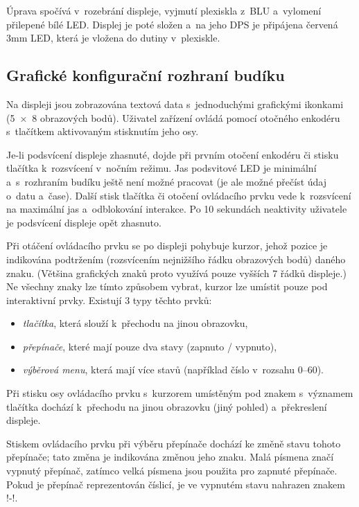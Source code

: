 Úprava spočívá v~rozebrání displeje, vyjmutí plexiskla z~BLU a~vylomení
přilepené bílé LED. Displej je poté složen a~na jeho DPS je připájena červená
\num{3}\si{\milli\meter} LED, která je vložena do dutiny v~plexiskle.


\FloatBarrier
\subsection{Grafické konfigurační rozhraní budíku}
Na displeji jsou zobrazována textová data s~jednoduchými grafickými ikonkami
(\num{5 x 8} obrazových bodů). Uživatel zařízení ovládá pomocí otočného
enkodéru s~tlačítkem aktivovaným stisknutím jeho osy.

Je-li podsvícení displeje zhasnuté, dojde při prvním otočení enkodéru či stisku
tlačítka k~rozsvícení v~nočním režimu. Jas podsvitové LED je minimální
a~s~rozhraním budíku ještě není možné pracovat (je ale možné přečíst údaj
o~datu a~čase). Další stisk tlačítka či otočení ovládacího prvku vede
k~rozsvícení na maximální jas a~odblokování interakce. Po \num{10} sekundách
neaktivity uživatele je podsvícení displeje opět zhasnuto.

Při otáčení ovládacího prvku se po displeji pohybuje kurzor, jehož pozice je
indikována podtržením (rozsvícením nejnižšího řádku obrazových bodů) daného
znaku. (Většina grafických znaků proto využívá pouze vyšších \num{7} řádků
displeje.) Ne všechny znaky lze tímto způsobem vybrat, kurzor lze umístit pouze
pod interaktivní prvky. Existují 3 typy těchto prvků:
\begin{itemize}[nosep]
    \item \emph{tlačítka}, která slouží k~přechodu na jinou obrazovku,
    \item \emph{přepínače}, které mají pouze dva stavy (zapnuto / vypnuto),
    \item \emph{výběrová menu}, která mají více stavů (například číslo
        v~rozsahu \numrange{0}{60}).
\end{itemize}

Při stisku osy ovládacího prvku s~kurzorem umístěným pod znakem s~významem
tlačítka dochází k~přechodu na jinou obrazovku (jiný pohled) a~překreslení
displeje.

Stiskem ovládacího prvku při výběru přepínače dochází ke změně stavu tohoto
přepínače; tato změna je indikována změnou jeho znaku. Malá písmena značí
vypnutý přepínač, zatímco velká písmena jsou použita pro zapnuté přepínače.
Pokud je přepínač reprezentován číslicí, je ve vypnutém stavu nahrazen znakem
!-!.

